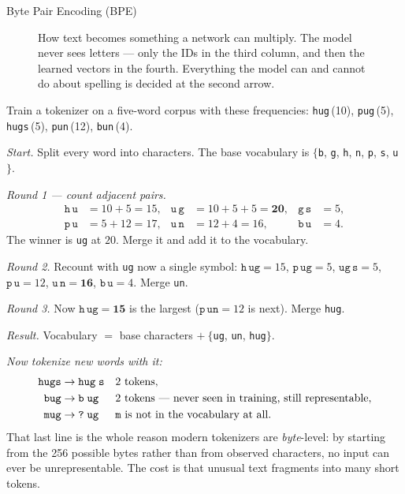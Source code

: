 \begin{v3topic}{Byte Pair Encoding (BPE)}
\begin{figure}[htbp]
\caption{How text becomes something a network can multiply. The model never
sees letters --- only the IDs in the third column, and then the learned vectors
in the fourth. Everything the model can and cannot do about spelling is decided
at the second arrow.}
\label{fig:nlp-tokenization-pipeline}
\end{figure}

\begin{workedexample}
Train a tokenizer on a five-word corpus with these frequencies:
\texttt{hug}\,(10), \texttt{pug}\,(5), \texttt{hugs}\,(5), \texttt{pun}\,(12),
\texttt{bun}\,(4).

\emph{Start.} Split every word into characters. The base vocabulary is
$\{$\texttt{b}, \texttt{g}, \texttt{h}, \texttt{n}, \texttt{p}, \texttt{s},
\texttt{u}$\}$.

\emph{Round 1 --- count adjacent pairs.}
\[
\begin{aligned}
  \texttt{h}\,\texttt{u} &= 10+5 = 15, &
  \texttt{u}\,\texttt{g} &= 10+5+5 = \mathbf{20}, &
  \texttt{g}\,\texttt{s} &= 5,\\
  \texttt{p}\,\texttt{u} &= 5+12 = 17, &
  \texttt{u}\,\texttt{n} &= 12+4 = 16, &
  \texttt{b}\,\texttt{u} &= 4.
\end{aligned}
\]
The winner is \texttt{ug} at $20$. Merge it and add it to the vocabulary.

\emph{Round 2.} Recount with \texttt{ug} now a single symbol:
$\texttt{h}\,\texttt{ug} = 15$, $\texttt{p}\,\texttt{ug} = 5$,
$\texttt{ug}\,\texttt{s} = 5$, $\texttt{p}\,\texttt{u} = 12$,
$\texttt{u}\,\texttt{n} = \mathbf{16}$, $\texttt{b}\,\texttt{u} = 4$.
Merge \texttt{un}.

\emph{Round 3.} Now $\texttt{h}\,\texttt{ug} = \mathbf{15}$ is the largest
($\texttt{p}\,\texttt{un} = 12$ is next). Merge \texttt{hug}.

\emph{Result.} Vocabulary $=$ base characters $+\ \{$\texttt{ug},
\texttt{un}, \texttt{hug}$\}$.

\emph{Now tokenize new words with it:}
\[
\begin{aligned}
  \texttt{hugs} &\rightarrow \texttt{hug}\;\texttt{s}
    &&\text{2 tokens},\\
  \texttt{bug}  &\rightarrow \texttt{b}\;\texttt{ug}
    &&\text{2 tokens --- never seen in training, still representable},\\
  \texttt{mug}  &\rightarrow \texttt{?}\;\texttt{ug}
    &&\text{\texttt{m} is not in the vocabulary at all.}
\end{aligned}
\]
That last line is the whole reason modern tokenizers are \emph{byte}-level: by
starting from the 256 possible bytes rather than from observed characters, no
input can ever be unrepresentable. The cost is that unusual text fragments into
many short tokens.
\end{workedexample}


\end{v3topic}
